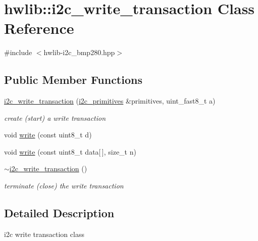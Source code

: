 \hypertarget{classhwlib_1_1i2c__write__transaction}{}\section{hwlib\+::i2c\+\_\+write\+\_\+transaction Class Reference}
\label{classhwlib_1_1i2c__write__transaction}


{\ttfamily \#include $<$hwlib-\/i2c\+\_\+bmp280.\+hpp$>$}

\subsection*{Public Member Functions}
\begin{DoxyCompactItemize}
\item 
\mbox{\label{classhwlib_1_1i2c__write__transaction_a9238d0369f2249ea8de55383a0396db2}} 
\mbox{\hyperlink{classhwlib_1_1i2c__write__transaction_a9238d0369f2249ea8de55383a0396db2}{i2c\+\_\+write\+\_\+transaction}} (\mbox{\hyperlink{classhwlib_1_1i2c__primitives}{i2c\+\_\+primitives}} \&primitives, uint\+\_\+fast8\+\_\+t a)
\begin{DoxyCompactList}\small\item\em create (start) a write transaction \end{DoxyCompactList}\item 
void \mbox{\hyperlink{classhwlib_1_1i2c__write__transaction_a15fdb954f92b784f2d723892b57f6728}{write}} (const uint8\+\_\+t d)
\item 
void \mbox{\hyperlink{classhwlib_1_1i2c__write__transaction_a518cffb445b15fc027d2689f17ef45e8}{write}} (const uint8\+\_\+t data\mbox{[}$\,$\mbox{]}, size\+\_\+t n)
\item 
\mbox{\label{classhwlib_1_1i2c__write__transaction_a57a9e4a60bd32b521159b86898a842b7}} 
\mbox{\hyperlink{classhwlib_1_1i2c__write__transaction_a57a9e4a60bd32b521159b86898a842b7}{$\sim$i2c\+\_\+write\+\_\+transaction}} ()
\begin{DoxyCompactList}\small\item\em terminate (close) the write transaction \end{DoxyCompactList}\end{DoxyCompactItemize}


\subsection{Detailed Description}
i2c write transaction class

